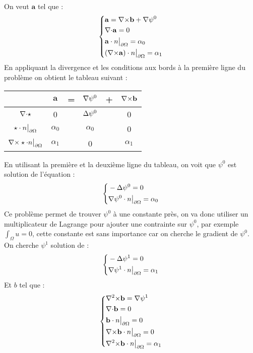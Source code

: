 On veut $\mathbf{a}$ tel que :
\begin{equation}
\label{a}
\left\{
\begin{aligned}
&\mathbf{a}={\nabla\times} \mathbf{b}+{\nabla}\psi^0\\
&{\nabla\cdot} \mathbf{a} =0\\
&\mathbf{a}\cdot n{\big\rvert_{\partial\Omega}} = \alpha_0\\
&({\nabla\times} \mathbf{a})\cdot n{\big\rvert_{\partial\Omega}} = \alpha_1
\end{aligned}
\right.
\end{equation}
En appliquant la divergence et les conditions aux bords à la première ligne du problème on obtient le tableau suivant :
\begin{center}
\begin{tabular}{c|ccccc}
& $\mathbf{a}$ & = & ${\nabla}\psi^0$ & + & ${\nabla\times} \mathbf{b}$ \\ \hline
${\nabla\cdot}\star$ & 0 & & ${\Delta}\psi^0$ & & 0\\ \hline
$\star\cdot n{\big\rvert_{\partial\Omega}}$ & $\alpha_0$ & & $\alpha_0$ & & 0\\ \hline
${\nabla\times}\star\cdot n{\big\rvert_{\partial\Omega}}$ & $\alpha_1$ & & 0 & & $\alpha_1$
\end{tabular}
\end{center}
En utilisant la première et la deuxième ligne du tableau, on voit que $\psi^0$ est solution de l'équation :
\begin{equation}
\label{psi0}
\left\{
\begin{aligned}
&-{\Delta}\psi^0 = 0\\
&{\nabla}\psi^0\cdot n{\big\rvert_{\partial\Omega}}=\alpha_0
\end{aligned}
\right.
\end{equation}
Ce problème permet de trouver $\psi^0$ à une constante près, on va donc utiliser un multiplicateur de Lagrange pour ajouter une contrainte sur $\psi^0$, par exemple $\int_\Omega u = 0$, cette constante est sans importance car on cherche le gradient de $\psi^0$.\\

On cherche $\psi^1$ solution de :
\begin{equation}
\label{psi1}
\left\{
\begin{aligned}
&-{\Delta}\psi^1 = 0\\
&{\nabla}\psi^1\cdot n{\big\rvert_{\partial\Omega}}=\alpha_1
\end{aligned}
\right.
\end{equation}
Et $b$ tel que :
\begin{equation}
\label{curlb}
\left\{
\begin{aligned}
&{\nabla^2\times} \mathbf{b} = {\nabla}\psi^1\\
&{\nabla\cdot} \mathbf{b} = 0\\
&\mathbf{b}\cdot n{\big\rvert_{\partial\Omega}} = 0\\
&{\nabla\times} \mathbf{b}\cdot n{\big\rvert_{\partial\Omega}} = 0\\
&{\nabla^2\times} \mathbf{b}\cdot n{\big\rvert_{\partial\Omega}} = \alpha_1
\end{aligned}
\right.
\end{equation}

